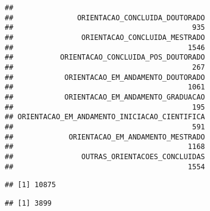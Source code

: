 \documentclass[]{article}
\newenvironment{Shaded}{\begin{snugshade}}{\end{snugshade}}
\newcommand{\KeywordTok}[1]{\textcolor[rgb]{0.13,0.29,0.53}{\textbf{#1}}}
\newcommand{\CommentTok}[1]{\textcolor[rgb]{0.56,0.35,0.01}{\textit{#1}}}
\newcommand{\ControlFlowTok}[1]{\textcolor[rgb]{0.13,0.29,0.53}{\textbf{#1}}}
\newcommand{\OperatorTok}[1]{\textcolor[rgb]{0.81,0.36,0.00}{\textbf{#1}}}
\newcommand{\NormalTok}[1]{#1}
\begin{document}
\begin{verbatim}
## 
##               ORIENTACAO_CONCLUIDA_DOUTORADO 
##                                          935 
##                ORIENTACAO_CONCLUIDA_MESTRADO 
##                                         1546 
##           ORIENTACAO_CONCLUIDA_POS_DOUTORADO 
##                                          267 
##            ORIENTACAO_EM_ANDAMENTO_DOUTORADO 
##                                         1061 
##            ORIENTACAO_EM_ANDAMENTO_GRADUACAO 
##                                          195 
## ORIENTACAO_EM_ANDAMENTO_INICIACAO_CIENTIFICA 
##                                          591 
##             ORIENTACAO_EM_ANDAMENTO_MESTRADO 
##                                         1168 
##                OUTRAS_ORIENTACOES_CONCLUIDAS 
##                                         1554
\end{verbatim}

\begin{Shaded}
\end{Shaded}

\begin{verbatim}
## [1] 10875
\end{verbatim}

\begin{Shaded}
\end{Shaded}

\begin{verbatim}
## [1] 3899
\end{verbatim}

\begin{Shaded}
\end{Shaded}
\end{document}
